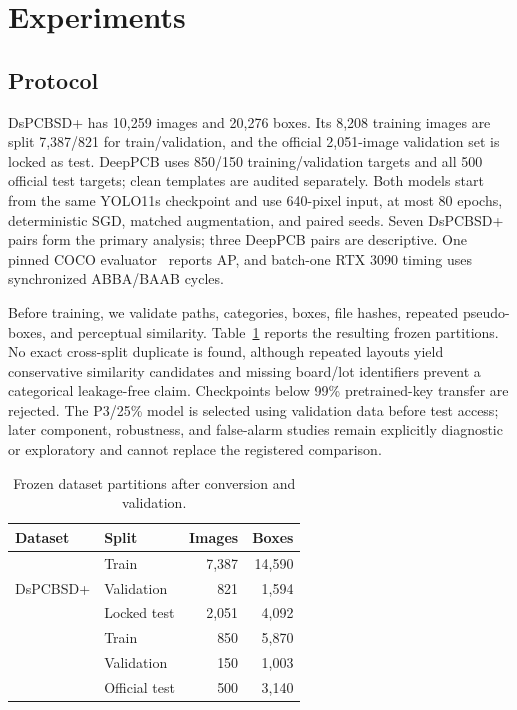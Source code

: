 \documentclass[conference]{IEEEtran}
\begin{document}
\section{Experiments}
\subsection{Protocol}
DsPCBSD+ has 10,259 images and 20,276 boxes. Its 8,208 training images are split 7,387/821 for train/validation, and the official 2,051-image validation set is locked as test. DeepPCB uses 850/150 training/validation targets and all 500 official test targets; clean templates are audited separately. Both models start from the same YOLO11s checkpoint and use 640-pixel input, at most 80 epochs, deterministic SGD, matched augmentation, and paired seeds. Seven DsPCBSD+ pairs form the primary analysis; three DeepPCB pairs are descriptive. One pinned COCO evaluator~\cite{coco} reports AP, and batch-one RTX 3090 timing uses synchronized ABBA/BAAB cycles.

Before training, we validate paths, categories, boxes, file hashes, repeated pseudo-boxes, and perceptual similarity. Table~\ref{tab:data} reports the resulting frozen partitions. No exact cross-split duplicate is found, although repeated layouts yield conservative similarity candidates and missing board/lot identifiers prevent a categorical leakage-free claim. Checkpoints below 99\% pretrained-key transfer are rejected. The P3/25\% model is selected using validation data before test access; later component, robustness, and false-alarm studies remain explicitly diagnostic or exploratory and cannot replace the registered comparison.

\begin{table}[t]
\centering
\caption{Frozen dataset partitions after conversion and validation.}
\label{tab:data}
\fontsize{7.5}{8.2}\selectfont
\setlength{\tabcolsep}{4.5pt}
\begin{tabular*}{\columnwidth}{@{\extracolsep{\fill}}llrr@{}}
\toprule
Dataset & Split & Images & Boxes \\
\midrule
\multirow{3}{*}{DsPCBSD+} & Train & 7,387 & 14,590 \\
 & Validation & 821 & 1,594 \\
 & Locked test & 2,051 & 4,092 \\
\addlinespace[1pt]
\multirow{3}{*}{DeepPCB} & Train & 850 & 5,870 \\
 & Validation & 150 & 1,003 \\
 & Official test & 500 & 3,140 \\
\bottomrule
\end{tabular*}
\end{table}
\end{document}
